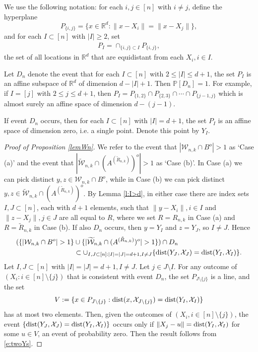 \documentclass[12pt]{article}
\newcommand{\cX}{\mathcal{X}}
\newcommand{\cW}{\mathcal{W}}
\newcommand{\tcW}{\widetilde{\mathcal{W}}}
\renewcommand{\Pr}{\mathbb{P}}
\newcommand{\X}{\mathcal{X}}
\newcommand{\tR}{{\tilde{R}}}
\newcommand{\R}{\mathbb{R}}
\newcommand{\dist}{{\rm dist}}
\begin{document}
We use the following notation: for each $i,j \in [n]$ with $i \neq j$, 
define the hyperplane
$$
P_{\{i,j\}} = \{x \in \R^d: \|x-X_i \|= \|x-X_j\| \},
$$
and for each $I \subset [n]$ with $|I| \geq 2$, set
\begin{align}
P_I = \cap_{\{i,j\} \subset  I } P_{\{i,j\}},
	\label{e:defPI}
\end{align}
the set of all locations in $\R^d$ that are equidistant from each $X_i,i \in I$.

Let $D_n$ denote the event that for each $I \subset [n]$ with $ 2 \leq |I| 
\leq d+1$,
the set $P_I$ is an affine subspace of $\R^d$ of dimension $d-|I|+1$.
Then $\Pr[D_n] = 1$. For example, if $I= [j]$ with $2 \leq j \leq d+1$,
then $P_I = P_{\{1,2\}} \cap P_{\{2,3\}} \cap \cdots \cap P_{\{j-1,j\}}$ which
is almost surely an affine space of dimension $d-(j-1)$.

If event $D_n$ occurs, then for each $I \subset [n]$ with $|I|= d+1$, the
set $P_I$ is an affine space of dimension zero, i.e. a single point. Denote
this point by $Y_I$.


\begin{proof}[Proof of Proposition \ref{lemWn}]
	We refer to the event that
	 $|\cW_{n,k} \cap  B^o| > 1 $
	 as `Case (a)' and the event that
	 $|\tcW_{n,k} \cap (A^{(\tR_{n,k})})^o| > 1 $
	 as `Case (b)'.
	In Case (a) we can pick distinct $y,z \in \cW_{n,k} \cap B^o$,
	while in Case (b) we can pick distinct $y,z \in \tcW_{n,k} \cap 
	(A^{(\tR_{n,k})})^o$.
	By Lemma \ref{l:I>d}, in either case there are index sets
	$I,J \subset [n]$, each with $d+1$ elements, such that 
	   $\|y-X_i\|, i \in I$ and $\|z- X_j\|, j \in J$ are all equal
	  to $R$, where we set $R = R_{n,k}$ in
	  Case (a) and $R = \tR_{n,k}$ in Case (b).
	  If also $D_n$ occurs, then $y = Y_I$ and $z = Y_{J}$, so
	  $I \neq J$. Hence
	  \begin{align}
		  ( \{|\cW_{n,k} \cap B^o | >1 \} 
		  &
		  \cup 
		  \{|\tcW_{n,k} \cap (A^{(\tR_{n,k})})^o | >1 \} ) 
	  \cap D_n 
		  \nonumber \\
		  &
		  \subset \cup_{I,J \subset [n]: |I|= |J|= d+1, I \neq J}
	  \{\dist(Y_J,\cX_J) = \dist(Y_I,\cX_I)\}.
		  \label{e:twoYs}
	  \end{align}
	  Let
	  $I,J \subset [n]$ with $ |I|= |J|= d+1, I \neq J$.
	  Let $j \in J \setminus I$.
	  For any  outcome of $(X_i: i \in [n] \setminus \{j\})$
	  that is consistent with event $D_n$, the set $P_{J \setminus \{j\}}$
	  is a line, and the set %
	  $$
	 V:=  \{x \in P_{J \setminus \{j\} }:  \dist(x, \cX_{J \setminus \{j\}})
	  = \dist (Y_I, \cX_I) \}
	  $$
	  has at most two elements.
	  Then, given the outcomes
	  of $(X_i,i \in [n] \setminus \{j\})$, the event 
	  $\{\dist(Y_J,\cX_J) = \dist (Y_I,\cX_I)\}$
	  occurs  only if 
	  $\|X_j -u \| = \dist(Y_I, \cX_I)$ for some $u \in V$,
	  an event of probability zero.
	  Then the result follows
	  from \eqref{e:twoYs}.
\end{proof}
\end{document}
